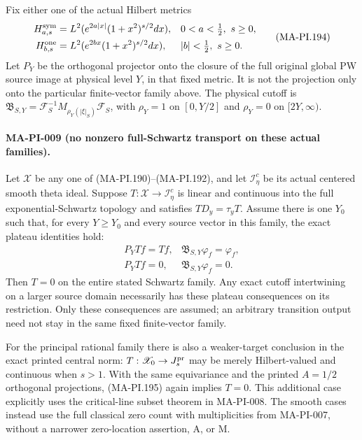 Fix either one of the actual Hilbert metrics
\[
 \begin{aligned}
 H^{\rm sym}_{a,s}&=L^2(e^{2a|x|}(1+x^2)^{s/2}dx),
       &&0<a<\tfrac12,\ s\ge0,\\
 H^{\rm one}_{b,s}&=L^2(e^{2bx}(1+x^2)^{s/2}dx),
       &&|b|<\tfrac12,\ s\ge0.
 \end{aligned}
 \tag{MA-PI.194}
\]
Let $P_Y$ be the orthogonal projector onto the closure of
the full original global PW source image at physical level
$Y$, in that fixed metric.  It is not the projection only
onto the particular finite-vector family above.
The physical cutoff is
$\mathfrak B_{S,Y}=\mathcal F_S^{-1}
M_{\rho_Y(|\xi|_S)}\mathcal F_S$, with
$\rho_Y=1$ on $[0,Y/2]$ and $\rho_Y=0$ on $[2Y,\infty)$.

\paragraph{MA-PI-009 (no nonzero full-Schwartz transport on these actual families).}
Let $\mathscr X$ be any one of (MA-PI.190)--(MA-PI.192),
and let $\mathscr I_\eta^c$ be its actual centered smooth
theta ideal.  Suppose
$T:\mathscr X\to\mathscr I_\eta^c$ is linear and continuous into
the full exponential-Schwartz topology and satisfies
$TD_y=\tau_yT$.
Assume there is one $Y_0$ such that, for every $Y\ge Y_0$
and every source vector in this family, the exact plateau
identities hold:
\[
 \begin{array}{ll}
 P_YTf=Tf,&\mathfrak B_{S,Y}\varphi_f=\varphi_f,\\
 P_YTf=0,&\mathfrak B_{S,Y}\varphi_f=0.
 \end{array}
 \tag{MA-PI.195}
\]
Then $T=0$ on the entire stated Schwartz family.
Any exact cutoff intertwining on a larger source domain
necessarily has these plateau consequences on its restriction.
Only these consequences are assumed; an arbitrary transition
output need not stay in the same fixed finite-vector family.

For the principal rational family there is also a weaker-target
conclusion in the exact printed central norm:
$T:\mathscr X_0\to J_s^{\rm pr}$ may be merely Hilbert-valued
and continuous when $s>1$.  With the same equivariance and
the printed $A=1/2$ orthogonal projections, (MA-PI.195)
again implies $T=0$.
This additional case explicitly uses the critical-line subset
theorem in MA-PI-008.  The smooth cases instead use the full
classical zero count with multiplicities from MA-PI-007,
without a narrower zero-location assertion, A, or M.

